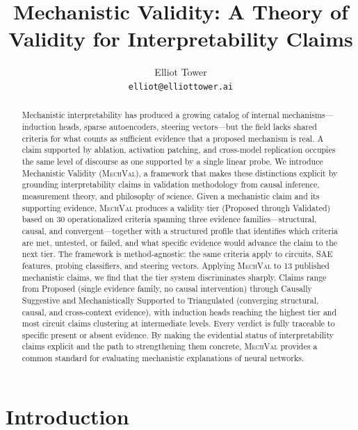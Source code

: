 \documentclass{article}
\title{Mechanistic Validity: A Theory of Validity for Interpretability Claims}
\author{
Elliot Tower \\
\texttt{elliot@elliottower.ai}
}
\newcommand{\mechval}{\textsc{MechVal}}
\begin{document}
\maketitle

\begin{abstract}
Mechanistic interpretability has produced a growing catalog of internal mechanisms---induction heads, sparse autoencoders, steering vectors---but the field lacks shared criteria for what counts as sufficient evidence that a proposed mechanism is real. A claim supported by ablation, activation patching, and cross-model replication occupies the same level of discourse as one supported by a single linear probe. We introduce Mechanistic Validity (\mechval{}), a framework that makes these distinctions explicit by grounding interpretability claims in validation methodology from causal inference, measurement theory, and philosophy of science. Given a mechanistic claim and its supporting evidence, \mechval{} produces a validity tier (Proposed through Validated) based on 30 operationalized criteria spanning three evidence families---structural, causal, and convergent---together with a structured profile that identifies which criteria are met, untested, or failed, and what specific evidence would advance the claim to the next tier. The framework is method-agnostic: the same criteria apply to circuits, SAE features, probing classifiers, and steering vectors. Applying \mechval{} to 13 published mechanistic claims, we find that the tier system discriminates sharply. Claims range from Proposed (single evidence family, no causal intervention) through Causally Suggestive and Mechanistically Supported to Triangulated (converging structural, causal, and cross-context evidence), with induction heads reaching the highest tier and most circuit claims clustering at intermediate levels. Every verdict is fully traceable to specific present or absent evidence. By making the evidential status of interpretability claims explicit and the path to strengthening them concrete, \mechval{} provides a common standard for evaluating mechanistic explanations of neural networks.
\end{abstract}

\section{Introduction}
\label{sec:intro}
\end{document}
